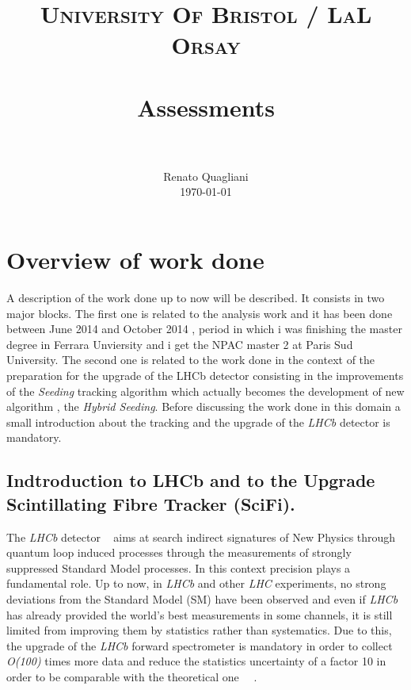 \documentclass[paper=a4, fontsize=10pt]{scrartcl}
\title{
		\usefont{OT1}{bch}{b}{n}
		\normalfont \normalsize \textsc{University Of Bristol / LaL Orsay} \\ [25pt]
		\horrule{0.5pt} \\[0.4cm]
		\huge Assessments \\
		\horrule{2pt} \\[0.5cm]
}
\author{
		\normalfont 								\normalsize
        Renato Quagliani\\[-3pt]		\normalsize
        \today
}
\date{}
\numberwithin{equation}{section}		%
\numberwithin{figure}{section}			%
\numberwithin{table}{section}				%
\begin{document}
\maketitle
\section{Overview of work done}
A description of the work done up to now will be described. It consists in two major blocks. The first one is related to the analysis work and it has been done between June 2014 and October 2014 , period in which i was finishing the master degree in Ferrara Unviersity and i get the NPAC master 2 at Paris Sud University. The second one is related to the work done in the context of the preparation for the upgrade of the LHCb detector consisting in the improvements of the \textit{Seeding} tracking algorithm which actually becomes the development of new algorithm , the \textit{Hybrid Seeding}.
Before discussing the work done in this domain a small introduction about the tracking and the upgrade of the \textit{LHCb} detector is mandatory.
\subsection{Indtroduction to LHCb and to the Upgrade Scintillating Fibre Tracker (SciFi).}
The \textit{LHCb} detector ~\cite{Blake1} aims at search indirect signatures of New Physics through quantum loop induced processes through the measurements of strongly suppressed Standard Model processes.
In this context precision plays a fundamental role. 
Up to now, in \textit{LHCb} and other \textit{LHC} experiments, no strong deviations from the Standard Model (SM) have been observed and even if \textit{LHCb} has already provided the world's best measurements in some channels, it is still limited from improving them by statistics rather than systematics. Due to this, the upgrade of the \textit{LHCb} forward spectrometer is mandatory in order to collect \textit{O(100)} times more data and reduce the statistics uncertainty of a factor 10 in order to be comparable with the theoretical one ~\cite{Blake2}~\cite{Blake3}.
\end{document}
